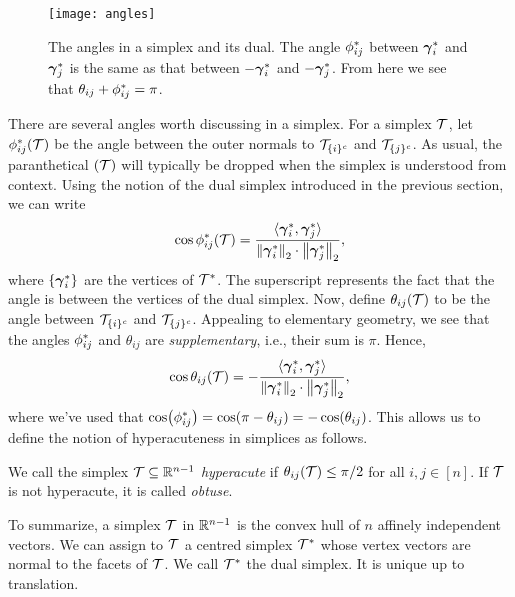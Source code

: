 \begin{figure}
	\centering
	\texttt{[image: angles]}
	\caption{The angles in a simplex and its dual. The angle $\phi^*_{ij}$ between $\vb*{\gamma}^*_i$ and $\vb*{\gamma}^*_j$ is the same as that between $-\vb*{\gamma}_i^*$ and $-\vb*{\gamma}_j^*$. From here  we  see that $\theta_{ij}+\phi^*_{ij}=\pi$.}
\end{figure}
There are several angles worth discussing in a simplex. For a simplex $\mathcal{T}$, let $\phi^*_{ij}(\mathcal{T})$ be the angle between the outer normals to $\mathcal{T}_{\{i\}^c}$ and $\mathcal{T}_{\{j\}^c}$. As usual, the paranthetical $(\mathcal{T})$ will typically be dropped when the simplex is understood from context. Using the notion of the dual simplex introduced in the previous section, we can write 
 \begin{equation*}
\cos \phi^*_{ij}(\mathcal{T}) = \frac{\langle \vb*{\gamma}^*_i,\vb*{\gamma}^*_j\rangle }{\norm{\vb*{\gamma}^*_i}_2 \cdot \norm{\vb*{\gamma}^*_j}_2},
\end{equation*}
where $\{\vb*{\gamma}^*_i\}$ are the vertices of $\mathcal{T}^*$. The superscript represents  the fact that the angle is between the  vertices of the dual simplex. 
Now, define $\theta_{ij}(\mathcal{T})$ to be the angle between $\mathcal{T}_{\{i\}^c}$ and $\mathcal{T}_{\{j\}^c}$. Appealing to elementary geometry, we see that the angles $\phi^*_{ij}$ and $\theta_{ij}$ are \emph{supplementary}, i.e., their sum is $\pi$. Hence, 
\begin{equation}
\label{eq:cos_theta_ij}
\cos \theta_{ij}(\mathcal{T}) = - \frac{\langle \vb*{\gamma}^*_i,\vb*{\gamma}^*_j\rangle }{\norm{\vb*{\gamma}^*_i}_2 \cdot \norm{\vb*{\gamma}^*_j}_2},
\end{equation}
where we've used that $\cos(\phi^*_{ij}) = \cos(\pi - \theta_{ij}) = -\cos(\theta_{ij})$. This allows us to define the notion of  hyperacuteness in simplices as follows. 

\begin{definition}
	\label{def:hyperacute}
	We call the simplex $\mathcal{T}\subseteq \mathbb{R}^{n-1}$ \emph{hyperacute} if $\theta_{ij}(\mathcal{T})\leq \pi/2$ for all $i,j\in[n]$. If $\mathcal{T}$ is not hyperacute, it is called \emph{obtuse}. 
\end{definition}

To summarize, a  simplex $\mathcal{T}$ in $\mathbb{R}^{n-1}$ is the convex  hull  of $n$ affinely independent vectors. We can assign to $\mathcal{T}$ a centred simplex $\mathcal{T}^*$  whose vertex vectors are normal  to  the facets of $\mathcal{T}$. We call $\mathcal{T}^*$  the dual simplex. It is unique  up to  translation. 


